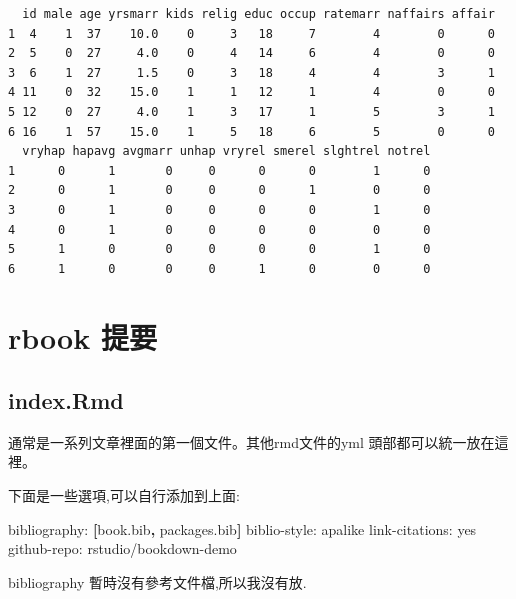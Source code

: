 \documentclass[]{book}
\newenvironment{Shaded}{\begin{snugshade}}{\end{snugshade}}
\newcommand{\AttributeTok}[1]{\textcolor[rgb]{0.77,0.63,0.00}{#1}}
\newcommand{\FunctionTok}[1]{\textcolor[rgb]{0.00,0.00,0.00}{#1}}
\newcommand{\KeywordTok}[1]{\textcolor[rgb]{0.13,0.29,0.53}{\textbf{#1}}}
\newcommand{\NormalTok}[1]{#1}
\theoremstyle{definition}
\theoremstyle{definition}
\theoremstyle{definition}
\theoremstyle{remark}
\begin{document}
\begin{verbatim}
  id male age yrsmarr kids relig educ occup ratemarr naffairs affair
1  4    1  37    10.0    0     3   18     7        4        0      0
2  5    0  27     4.0    0     4   14     6        4        0      0
3  6    1  27     1.5    0     3   18     4        4        3      1
4 11    0  32    15.0    1     1   12     1        4        0      0
5 12    0  27     4.0    1     3   17     1        5        3      1
6 16    1  57    15.0    1     5   18     6        5        0      0
  vryhap hapavg avgmarr unhap vryrel smerel slghtrel notrel
1      0      1       0     0      0      0        1      0
2      0      1       0     0      0      1        0      0
3      0      1       0     0      0      0        1      0
4      0      1       0     0      0      0        0      0
5      1      0       0     0      0      0        1      0
6      1      0       0     0      1      0        0      0
\end{verbatim}

\hypertarget{rbook-}{%
\chapter{rbook 提要}\label{rbook-}}

\hypertarget{index.rmd}{%
\section{index.Rmd}\label{index.rmd}}

通常是一系列文章裡面的第一個文件。其他rmd文件的yml
頭部都可以統一放在這裡。

下面是一些選項,可以自行添加到上面:

\begin{Shaded}
\begin{Highlighting}[]
\FunctionTok{bibliography:}\AttributeTok{ }\KeywordTok{[}\NormalTok{book.bib}\KeywordTok{,}\NormalTok{ packages.bib}\KeywordTok{]}
\FunctionTok{biblio-style:}\AttributeTok{ apalike}
\FunctionTok{link-citations:}\AttributeTok{ yes}
\FunctionTok{github-repo:}\AttributeTok{ rstudio/bookdown-demo}
\end{Highlighting}
\end{Shaded}

bibliography 暫時沒有參考文件檔,所以我沒有放.

\hypertarget{section-1}{%
\section{}\label{section-1}}
\end{document}
